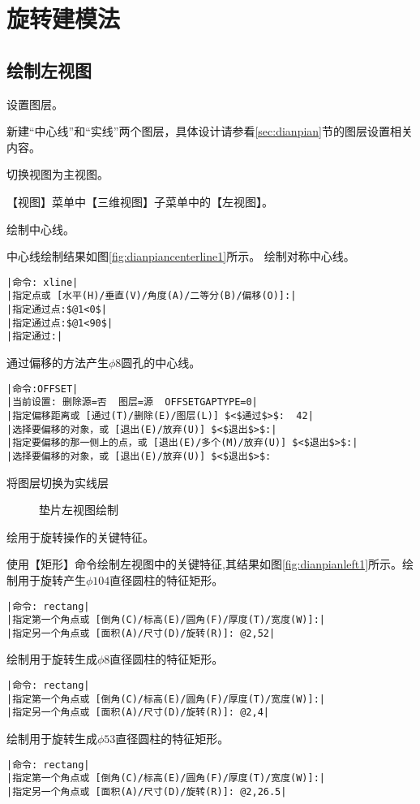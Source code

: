 \section{旋转建模法}
\subsection{绘制左视图}
\begin{procedure}
\item 设置图层。

新建“中心线”和“实线”两个图层，具体设计请参看\ref{sec:dianpian}节的图层设置相关内容。
\item  切换视图为主视图。

【视图】菜单中【三维视图】子菜单中的【左视图】。
\item 绘制中心线。

中心线绘制结果如图\ref{fig:dianpiancenterline1}所示。
绘制对称中心线。
\begin{lstlisting}
|命令: xline|
|指定点或 [水平(H)/垂直(V)/角度(A)/二等分(B)/偏移(O)]:|
|指定通过点:$@1<0$|
|指定通过点:$@1<90$|
|指定通过:|
\end{lstlisting}
通过偏移的方法产生$\phi 8$圆孔的中心线。
\begin{lstlisting}
|命令:OFFSET|
|当前设置: 删除源=否  图层=源  OFFSETGAPTYPE=0|
|指定偏移距离或 [通过(T)/删除(E)/图层(L)] $<$通过$>$:  42|
|选择要偏移的对象，或 [退出(E)/放弃(U)] $<$退出$>$:|
|指定要偏移的那一侧上的点，或 [退出(E)/多个(M)/放弃(U)] $<$退出$>$:|
|选择要偏移的对象，或 [退出(E)/放弃(U)] $<$退出$>$:
\end{lstlisting}
\item 将图层切换为实线层
\begin{figure}[htbp]
\centering
{}\hspace{40pt}
\caption{垫片左视图绘制}
\end{figure}
\item 绘用于旋转操作的关键特征。

使用【矩形】命令绘制左视图中的关键特征,其结果如图\ref{fig:dianpianleft1}所示。绘制用于旋转产生$\phi 104$直径圆柱的特征矩形。
\begin{lstlisting}
|命令: rectang|
|指定第一个角点或 [倒角(C)/标高(E)/圆角(F)/厚度(T)/宽度(W)]:|
|指定另一个角点或 [面积(A)/尺寸(D)/旋转(R)]: @2,52|
\end{lstlisting}
绘制用于旋转生成$\phi 8$直径圆柱的特征矩形。
\begin{lstlisting}
|命令: rectang|
|指定第一个角点或 [倒角(C)/标高(E)/圆角(F)/厚度(T)/宽度(W)]:|
|指定另一个角点或 [面积(A)/尺寸(D)/旋转(R)]: @2,4|
\end{lstlisting}
绘制用于旋转生成$\phi 53$直径圆柱的特征矩形。
\begin{lstlisting}
|命令: rectang|
|指定第一个角点或 [倒角(C)/标高(E)/圆角(F)/厚度(T)/宽度(W)]:|
|指定另一个角点或 [面积(A)/尺寸(D)/旋转(R)]: @2,26.5|
\end{lstlisting}
\end{procedure}

\endinput